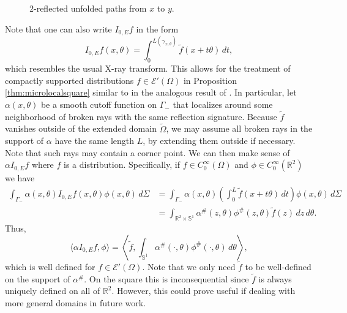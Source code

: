 \documentclass[10pt]{amsart}
\theoremstyle{definition}
\theoremstyle{definition}
\theoremstyle{definition}
\newcommand{ \rn }[1]{\mathbb{R}^{#1}}
\begin{document}
\begin{figure}
\centering
\def \svgwidth{0.7\columnwidth}

\caption{$2$-reflected unfolded paths from $x$ to $y$.\label{unfoldedpaths}}
\end{figure}

Note that one can also write $I_{0,E}f$ in the form
\begin{equation}
I_{0, E}f(x,\theta) = \int_{0}^{L(\gamma_{x,\theta})}\widetilde{f}(x+t\theta)\,dt,
\end{equation}
which resembles the usual X-ray transform. This allows for the treatment of compactly supported distributions $f \in \mathcal{E}'(\Omega)$ in Proposition \ref{thm:microlocalsquare} similar to in the analogous result of \cite{xraygeneric}. In particular, let $\alpha(x,\theta)$ be a smooth cutoff function on $\Gamma_{-}$ that localizes around some neighborhood of broken rays with the same reflection signature. Because $\widetilde{f}$ vanishes outside of the extended domain $\widetilde{\Omega}$, we may assume all broken rays in the support of $\alpha$ have the same length $L$, by extending them outside if necessary. Note that such rays may contain a corner point. We can then make sense of $\alpha I_{0,E}f$ where $f$ is a distribution. Specifically, if $f \in C_{0}^{\infty}(\Omega)$ and $\phi \in C_{0}^{\infty}(\rn{2})$ we have
\begin{align*}
 \int_{\Gamma_{-}} \alpha(x,\theta)I_{0,E}f(x,\theta)\phi(x,\theta)\,d\Sigma & = \int_{\Gamma_{-}}\alpha(x,\theta) \left( \int_{0}^{L}\widetilde{f}(x + t\theta)\,dt \right) \phi(x,\theta)\,d\Sigma\\
 & = \int_{\rn{2} \times \mathbb{S}^{1}}\alpha^{\#}(z,\theta) \phi^{\#}(z,\theta)\widetilde{f}(z) \,dz\,d\theta.
\end{align*}
Thus,
\begin{equation}
\langle \alpha I_{0,E}f, \phi \rangle = \left\langle \widetilde{f}, \int_{\mathbb{S}^{1}}\alpha^{\#}(\cdot, \theta)\phi^{\#}(\cdot, \theta)\,d\theta \right \rangle,
\end{equation}
which is well defined for $f \in \mathcal{E}'(\Omega)$. Note that we only need $\widetilde{f}$ to be well-defined on the support of $\alpha^{\#}$. On the square this is inconsequential since $\widetilde{f}$ is always uniquely defined on all of $\rn{2}$. However, this could prove useful if dealing with more general domains in future work.
\end{document}
